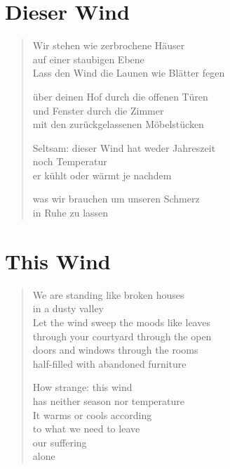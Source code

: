 
\cleartoverso

\section{Dieser Wind}

\begin{verse}

Wir stehen wie zerbrochene Häuser\\
auf einer staubigen Ebene\\
Lass den Wind die Launen wie Blätter fegen

über deinen Hof durch die offenen Türen\\
und Fenster durch die Zimmer\\
mit den zurückgelassenen Möbelstücken

Seltsam: dieser Wind hat weder Jahreszeit\\
noch Temperatur\\
er kühlt oder wärmt je nachdem

was wir brauchen um unseren Schmerz\\
in Ruhe zu lassen

\end{verse}

\clearpage

\section{This Wind}

\begin{verse}

We are standing like broken houses\\
in a dusty valley\\
Let the wind sweep the moods like leaves\\
through your courtyard through the open\\
doors and windows through the rooms\\
half-filled with abandoned furniture

How strange: this wind\\
has neither season nor temperature\\
It warms or cools according\\
to what we need to leave\\
our suffering\\
alone

\end{verse}
